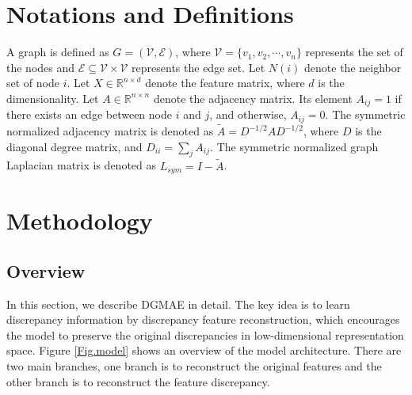\documentclass[sigconf]{acmart}
\begin{document}
\section{Notations and Definitions}
A graph is defined as $G=(\mathcal{V},\mathcal{E})$, where $\mathcal{V}=\{v_1,v_2,\cdots,v_n\}$ represents the set of the nodes and $\mathcal{E} \subseteq \mathcal{V} \times \mathcal{V}$ represents the edge set. Let $N (i)$ denote the neighbor set of node $i$. Let $X \in \mathbb{R}^{n\times d}$ denote the feature matrix, where $d$ is the dimensionality. Let $A \in \mathbb{R}^{n \times n}$ denote the adjacency matrix. Its element $A_{ij}=1$ if there exists an edge between node $i$ and $j$, and otherwise, $A_{ij}=0$. The symmetric normalized adjacency matrix is denoted as $\widetilde{A} = D^{-1/2}AD^{-1/2}$, where $D$ is the diagonal degree matrix, and $D_{ii} = \sum_{j}A_{ij}$. The symmetric normalized graph Laplacian matrix is denoted as $L_{sym} = I-\widetilde{A}$. 

\section{Methodology}

\subsection{Overview}
In this section, we describe DGMAE in detail. The key idea is to learn discrepancy information by discrepancy feature reconstruction, which encourages the model to preserve the original discrepancies in low-dimensional representation space. Figure \ref{Fig.model} shows an overview of the model architecture. There are two main branches, one branch is to reconstruct the original features and the other branch is to reconstruct the feature discrepancy.
\end{document}
